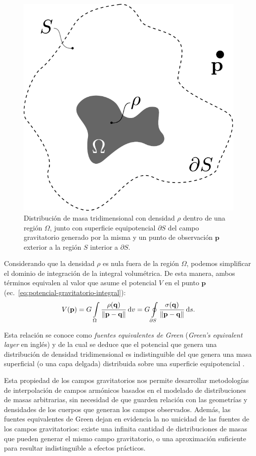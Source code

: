 \begin{figure}[t]
    \centering
    \includegraphics[width=0.4\linewidth]{figs/fuentes-equivalentes.pdf}
    \caption{
        Distribución de masa tridimensional con densidad $\rho$ dentro de una
        región $\Omega$, junto con superficie equipotencial $\partial S$ del
        campo gravitatorio generado por la misma y un punto de observación
        $\mathbf{p}$ exterior a la región $S$ interior a $\partial S$.
    }
    \label{fig:fuentes-equivalentes}
\end{figure}

Considerando que la densidad $\rho$ es nula fuera de la región $\Omega$,
podemos simplificar el dominio de integración de la integral volumétrica.
De esta manera, ambos términos equivalen al valor que asume el potencial $V$ en
el punto $\mathbf{p}$ (ec.~\ref{eq:potencial-gravitatorio-integral}):
%
\begin{equation}
    V(\mathbf{p}) =
    G \int\limits_\Omega
        \frac{\rho(\mathbf{q})}{\left\lVert \mathbf{p} - \mathbf{q}
            \right\rVert}
    \mathop{}\!\textnormal{d} v
    =
    G \oint\limits_{\partial S}
        \frac{\sigma(\mathbf{q})}{\left\lVert \mathbf{p} - \mathbf{q}
            \right\rVert}
    \mathop{}\!\textnormal{d} s.
\end{equation}

Esta relación se conoce como \emph{fuentes equivalentes de Green}
(\emph{Green's equivalent layer} en inglés) y de la cual se deduce que el
potencial que genera una distribución de densidad tridimensional es
indistinguible del que genera una masa superficial (o una capa delgada)
distribuida sobre una superficie equipotencial \citep[][p.~62]{blakely1995}.

Esta propiedad de los campos gravitatorios nos permite desarrollar metodologías
de interpolación de campos armónicos basados en el modelado de distribuciones
de masas arbitrarias, sin necesidad de que guarden relación con las geometrías
y densidades de los cuerpos que generan los campos observados.
Además, las fuentes equivalentes de Green dejan en evidencia la no unicidad de
las fuentes de los campos gravitatorios: existe una infinita cantidad de
distribuciones de masas que pueden generar el mismo campo gravitatorio, o una
aproximación suficiente para resultar indistinguible a efectos prácticos.
